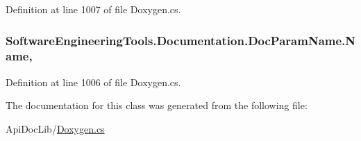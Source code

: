 Definition at line 1007 of file Doxygen.\+cs.

\hypertarget{class_software_engineering_tools_1_1_documentation_1_1_doc_param_name_ab7dec2f8730fe0d01e3e58ea7005ea2b}{
\subsubsection[{Name}]{ Software\+Engineering\+Tools.\+Documentation.\+Doc\+Param\+Name.\+Name\hspace{0.3cm}{\ttfamily [get]}, {\ttfamily [set]}}}\label{class_software_engineering_tools_1_1_documentation_1_1_doc_param_name_ab7dec2f8730fe0d01e3e58ea7005ea2b}


Definition at line 1006 of file Doxygen.\+cs.



The documentation for this class was generated from the following file\+:\begin{DoxyCompactItemize}
\item 
Api\+Doc\+Lib/\hyperlink{_doxygen_8cs}{Doxygen.\+cs}\end{DoxyCompactItemize}
